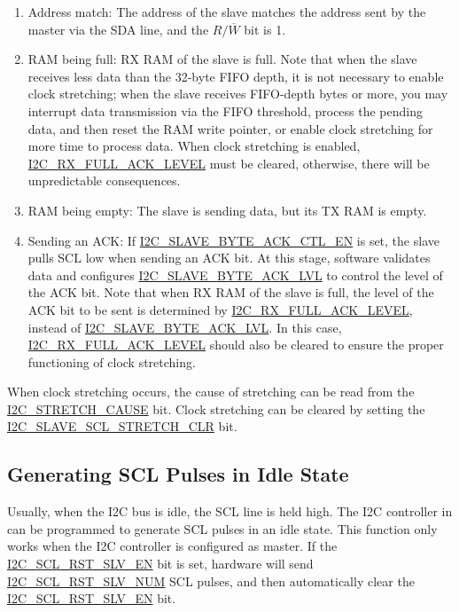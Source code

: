 \documentclass[main\_\_EN.tex]{subfiles}
\begin{document}
\begin{enumerate}
\item Address match: The address of the slave matches the address sent by the master via the SDA line, and the $R/\overline W$ bit is 1.
\item RAM being full: RX RAM of the slave is full. Note that when the slave receives less data than the 32-byte FIFO depth, it is not necessary to enable clock stretching; when the slave receives FIFO-depth bytes or more, you may interrupt data transmission via the FIFO threshold, process the pending data, and then reset the RAM write pointer, or enable clock stretching for more time to process data. When clock stretching is enabled, \hyperref[fielddesc:I2CRXFULLACKLEVEL]{I2C\_RX\_FULL\_ACK\_LEVEL} must be cleared, otherwise, there will be unpredictable consequences.
\item RAM being empty: The slave is sending data, but its TX RAM is empty.
\item Sending an ACK: If \hyperref[fielddesc:I2CSLAVEBYTEACKCTLEN]{I2C\_SLAVE\_BYTE\_ACK\_CTL\_EN} is set, the slave pulls SCL low when sending an ACK bit. At this stage, software validates data and configures \hyperref[fielddesc:I2CSLAVEBYTEACKLVL]{I2C\_SLAVE\_BYTE\_ACK\_LVL} to control the level of the ACK bit. Note that when RX RAM of the slave is full, the level of the ACK bit to be sent is determined by \hyperref[fielddesc:I2CRXFULLACKLEVEL]{I2C\_RX\_FULL\_ACK\_LEVEL}, instead of \hyperref[fielddesc:I2CSLAVEBYTEACKLVL]{I2C\_SLAVE\_BYTE\_ACK\_LVL}. In this case, \hyperref[fielddesc:I2CRXFULLACKLEVEL]{I2C\_RX\_FULL\_ACK\_LEVEL} should also be cleared to ensure the proper functioning of clock stretching.
\end{enumerate}

When clock stretching occurs, the cause of stretching can be read from the \hyperref[fielddesc:I2CSTRETCHCAUSE]{I2C\_STRETCH\_CAUSE} bit. Clock stretching can be cleared by setting the \hyperref[fielddesc:I2CSLAVESCLSTRETCHCLR]{I2C\_SLAVE\_SCL\_STRETCH\_CLR} bit.

\subsection{Generating SCL Pulses in Idle State}
Usually, when the I2C bus is idle, the SCL line is held high. The I2C controller in \chipname{} can be programmed to generate SCL pulses in an idle state. This function only works when the I2C controller is configured as master. If the \hyperref[fielddesc:I2CSCLRSTSLVEN]{I2C\_SCL\_RST\_SLV\_EN} bit is set, hardware will send \hyperref[fielddesc:I2CSCLRSTSLVNUM]{I2C\_SCL\_RST\_SLV\_NUM} SCL pulses, and then automatically clear the \hyperref[fielddesc:I2CSCLRSTSLVEN]{I2C\_SCL\_RST\_SLV\_EN} bit. 
\end{document}
